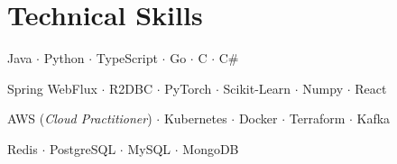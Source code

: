 \documentclass[letterpaper,11pt]{article}
\begin{document}
\section{Technical Skills}
 \begin{description}[leftmargin=!,labelwidth=\widthof{\textsc{Programming Languages}}, itemsep=0.5pt, parsep=0.5pt, font=\normalfont\small]
    \item[\textsc{Programming Languages:}] \small Java $\cdot$ Python $\cdot$ TypeScript $\cdot$ Go $\cdot$ C $\cdot$ C\#
    \item[\textsc{Frameworks/Libraries:}]  Spring WebFlux $\cdot$ R2DBC $\cdot$ PyTorch $\cdot$ Scikit-Learn $\cdot$ Numpy $\cdot$ React
    \item[\textsc{Cloud/DevOps:}] \small AWS (\textit{Cloud Practitioner}) $\cdot$ Kubernetes $\cdot$ Docker $\cdot$ Terraform $\cdot$ Kafka
    \item[\textsc{Databases:}] \small Redis $\cdot$ PostgreSQL $\cdot$ MySQL $\cdot$ MongoDB
    
\end{description}
\vspace{-4pt}


\end{document}
